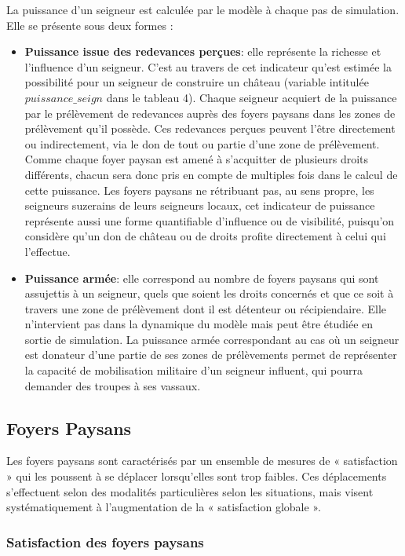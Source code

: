 \documentclass[12pt, a4paper, oneside]{book}
\begin{document}
	La puissance d'un seigneur est calculée par le modèle à chaque pas de simulation.
	Elle se présente sous deux formes :
	\begin{itemize}
	\item \textbf{Puissance issue des redevances perçues}: elle représente la richesse et l'influence d'un seigneur.
	C'est au travers de cet indicateur qu'est estimée la possibilité pour un seigneur de construire un château (variable intitulée $puissance\_seign$ dans le tableau 4).
	Chaque seigneur acquiert de la puissance par le prélèvement de redevances auprès des foyers paysans dans les zones de prélèvement qu'il possède.
	Ces redevances perçues peuvent l'être directement ou indirectement, via le don de tout ou partie d'une zone de prélèvement.
	Comme chaque foyer paysan est amené à s'acquitter de plusieurs droits différents, chacun sera donc pris en compte de multiples fois dans le calcul de cette puissance.
	Les foyers paysans ne rétribuant pas, au sens propre, les seigneurs suzerains de leurs seigneurs locaux, cet indicateur de puissance représente aussi une forme quantifiable d'influence ou de visibilité, puisqu'on considère qu'un don de château ou de droits profite directement à celui qui l'effectue.
	
	\item \textbf{Puissance armée}: elle correspond au nombre de foyers paysans qui sont assujettis à un seigneur, quels que soient les droits concernés et que ce soit à travers une zone de prélèvement dont il est détenteur ou récipiendaire.
	Elle n'intervient pas dans la dynamique du modèle mais peut être étudiée en sortie de simulation.
	La puissance armée correspondant au cas où un seigneur est donateur d'une partie de ses zones de prélèvements permet de représenter la capacité de mobilisation militaire d'un seigneur influent, qui pourra demander des troupes à ses vassaux.
	\end{itemize}

	\subsection{Foyers Paysans}
	
	Les foyers paysans sont caractérisés par un ensemble de mesures de « satisfaction » qui les poussent à se déplacer lorsqu'elles sont trop faibles.
	Ces déplacements s'effectuent selon des modalités particulières selon les situations, mais visent systématiquement à l'augmentation de la « satisfaction globale ».
	
	\subsubsection{Satisfaction des foyers paysans}
	
\end{document}

